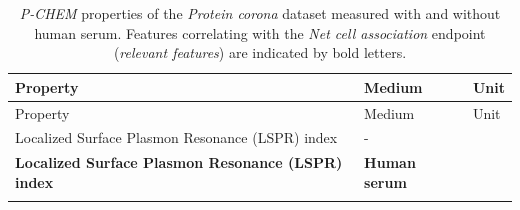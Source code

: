 \documentclass[utf8]{frontiersHLTH} %
\begin{document}
\begin{longtable}[]{@{}lll@{}}
\caption{\emph{P-CHEM} properties of the \emph{Protein corona} dataset
measured with and without human serum. Features correlating with the
\emph{Net cell association} endpoint (\emph{relevant features}) are
indicated by bold letters. }\tabularnewline
\toprule
\begin{minipage}[b]{0.58\columnwidth}\raggedright\strut
Property\strut
\end{minipage} & \begin{minipage}[b]{0.20\columnwidth}\raggedright\strut
Medium\strut
\end{minipage} & \begin{minipage}[b]{0.13\columnwidth}\raggedright\strut
Unit\strut
\end{minipage}\tabularnewline
\midrule
\endfirsthead
\toprule
\begin{minipage}[b]{0.58\columnwidth}\raggedright\strut
Property\strut
\end{minipage} & \begin{minipage}[b]{0.20\columnwidth}\raggedright\strut
Medium\strut
\end{minipage} & \begin{minipage}[b]{0.13\columnwidth}\raggedright\strut
Unit\strut
\end{minipage}\tabularnewline
\midrule
\endhead
\begin{minipage}[t]{0.58\columnwidth}\raggedright\strut
Localized Surface Plasmon Resonance (LSPR) index\strut
\end{minipage} & \begin{minipage}[t]{0.20\columnwidth}\raggedright\strut
-\strut
\end{minipage} & \begin{minipage}[t]{0.13\columnwidth}\raggedright\strut
\strut
\end{minipage}\tabularnewline
\begin{minipage}[t]{0.58\columnwidth}\raggedright\strut
\textbf{Localized Surface Plasmon Resonance (LSPR) index}\strut
\end{minipage} & \begin{minipage}[t]{0.20\columnwidth}\raggedright\strut
\textbf{Human serum}\strut
\end{minipage} & \begin{minipage}[t]{0.13\columnwidth}\raggedright\strut
\strut
\end{minipage}\tabularnewline
\begin{minipage}[t]{0.58\columnwidth}\raggedright\strut

\end{minipage}
\end{longtable}
\end{document}
